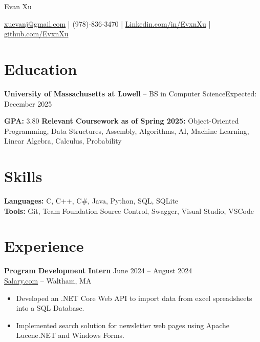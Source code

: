 \documentclass[11pt]{article}       %
\begin{document}
\centerline{\Huge Evan Xu}

\vspace{5pt}

\centerline{\href{mailto:xuevanj@gmail.com}{xuevanj@gmail.com} | (978)-836-3470 | \href{Linkedin.com/in/EvxnXu}{Linkedin.com/in/EvxnXu} | \href{github.com/EvxnXu}{github.com/EvxnXu}}

\vspace{-10pt}

\section*{Education}
\textbf{University of Massachusetts at Lowell} -- BS in Computer Science\hfill Expected: December 2025

\textbf{GPA:} 3.80 \newline \newline
\textbf{Relevant Coursework as of Spring 2025:} Object-Oriented Programming, Data Structures, Assembly, Algorithms, AI, Machine Learning, Linear Algebra, Calculus, Probability \\


\vspace{-9pt}

\section*{Skills}
\textbf{Languages:} C, C++, C\#, Java, Python, SQL, SQLite\\
\textbf{Tools:} Git, Team Foundation Source Control, Swagger, Visual Studio, VSCode

\vspace{-9pt}

\section*{Experience}

\textbf{Program Development Intern}  \hfill June 2024 -- August 2024 \\
\href{https://www.salary.com/}{Salary.com} -- Waltham, MA \\
\vspace{-9pt}
\begin{itemize}
  \item Developed an .NET Core Web API to import data from excel spreadsheets into a SQL Database.
  \item  Implemented search solution for newsletter web pages using Apache Lucene.NET and Windows Forms.
\end{itemize}
\end{document}
